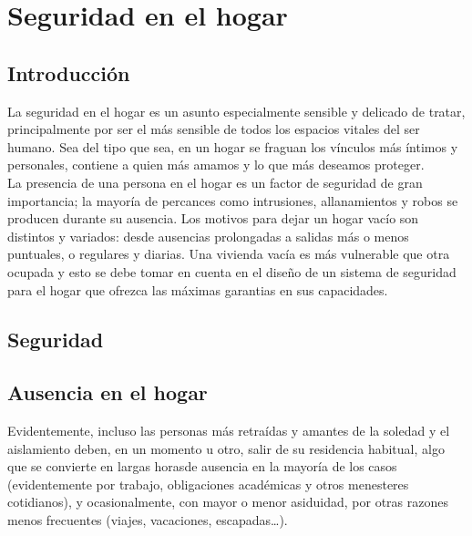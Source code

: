 \chapter{Seguridad en el hogar}



\section{Introducción}
La seguridad en el hogar es un asunto especialmente sensible y delicado de tratar, principalmente por ser el más sensible de todos los espacios vitales del ser humano. Sea del tipo que sea, en un hogar se fraguan los vínculos más íntimos y personales, contiene a quien más amamos y lo que más deseamos proteger.\\

La presencia de una persona en el hogar es un factor de seguridad de gran importancia; la mayoría de percances como intrusiones, allanamientos y robos se producen durante su ausencia. Los motivos para dejar un hogar vacío son distintos y variados: desde ausencias prolongadas a salidas más o menos puntuales, o regulares y diarias. Una vivienda vacía es más vulnerable que otra ocupada y esto se debe tomar en cuenta en el diseño de un sistema de seguridad para el hogar que ofrezca las máximas garantias en sus capacidades.\\

\section{Seguridad}

\section{Ausencia en el hogar}
Evidentemente, incluso las personas más retraídas y amantes de la soledad y el aislamiento deben, en un momento u otro, salir de su residencia habitual, algo que se convierte en largas horasde ausencia en la mayoría de los casos (evidentemente por trabajo, obligaciones académicas y otros menesteres cotidianos), y ocasionalmente, con mayor o menor asiduidad, por otras razones menos frecuentes (viajes, vacaciones, escapadas…).\\
 
